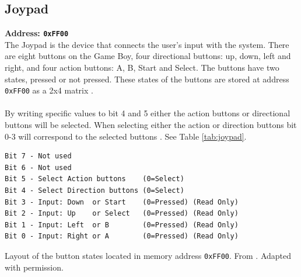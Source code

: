 



\subsection{Joypad}
\label{sec:Joypad}
\textbf{Address: \texttt{0xFF00}}
\\
The Joypad is the device that connects the user's input with the system. 
There are eight buttons on the Game Boy, four directional buttons: up, down, left and right, and four action buttons: A, B, Start and Select.
The buttons have two states, pressed or not pressed. 
These states of the buttons are stored at address \texttt{0xFF00} as a 2x4 matrix \cite{pandocsjoypad}.
\\\\
By writing specific values to bit 4 and 5 either the action buttons or directional buttons will be selected.
When selecting either the action or direction buttons bit 0-3 will correspond to the selected buttons \cite{pandocsjoypad}. See Table \ref{tab:joypad}.


\begin{table}[H]
    \begin{center}

\begin{BVerbatim}
Bit 7 - Not used
Bit 6 - Not used
Bit 5 - Select Action buttons    (0=Select)
Bit 4 - Select Direction buttons (0=Select)
Bit 3 - Input: Down  or Start    (0=Pressed) (Read Only)
Bit 2 - Input: Up    or Select   (0=Pressed) (Read Only)
Bit 1 - Input: Left  or B        (0=Pressed) (Read Only)
Bit 0 - Input: Right or A        (0=Pressed) (Read Only)
\end{BVerbatim}

    \caption{Layout of the button states located in memory address \texttt{0xFF00}. From \cite{pandocsjoypad}. Adapted with permission.}
    \label{tab:joypad}
    \end{center}
\end{table}

